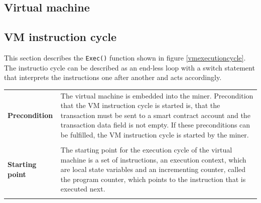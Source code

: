 \subsection{Virtual machine}
\subsection{VM instruction cycle} \label{exec_cycle}
This section describes the \texttt{Exec()} function shown in figure \ref{vmexecutioncycle}. The instructio cycle can be described as an end-less loop with a switch statement that interprets the instructions one after another and acts accordingly.

\begin{tabular}[t]{ p{3cm} p{12.5cm}}
\raggedright
\textbf{Precondition} & 
The virtual machine is embedded into the miner. Precondition that the VM instruction cycle is started is, that the transaction must be sent to a smart contract account and the transaction data field is not empty. If these preconditions can be fulfilled, the VM instruction cycle is started by the miner. \\ \\

\textbf{Starting point} & 
The starting point for the execution cycle of the virtual machine is a set of instructions, an execution context, which are local state variables and an incrementing counter, called the program counter, which points to the instruction that is executed next. \\ \\


\end{tabular}
